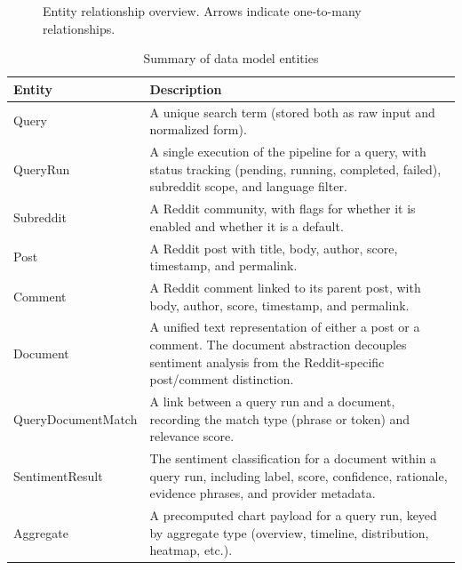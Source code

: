 \begin{figure}[H]
    \centering
    \caption{Entity relationship overview. Arrows indicate one-to-many relationships.}
    \label{fig:er_diagram}
\end{figure}

\begin{table}[H]
\centering
\caption{Summary of data model entities}
\label{tab:entities}
\small
\begin{tabularx}{\textwidth}{l>{\raggedright\arraybackslash}X}
\toprule
\textbf{Entity} & \textbf{Description} \\
\midrule
Query & A unique search term (stored both as raw input and normalized form). \\
QueryRun & A single execution of the pipeline for a query, with status tracking (pending, running, completed, failed), subreddit scope, and language filter. \\
Subreddit & A Reddit community, with flags for whether it is enabled and whether it is a default. \\
Post & A Reddit post with title, body, author, score, timestamp, and permalink. \\
Comment & A Reddit comment linked to its parent post, with body, author, score, timestamp, and permalink. \\
Document & A unified text representation of either a post or a comment. The document abstraction decouples sentiment analysis from the Reddit-specific post/comment distinction. \\
QueryDocumentMatch & A link between a query run and a document, recording the match type (phrase or token) and relevance score. \\
SentimentResult & The sentiment classification for a document within a query run, including label, score, confidence, rationale, evidence phrases, and provider metadata. \\
Aggregate & A precomputed chart payload for a query run, keyed by aggregate type (overview, timeline, distribution, heatmap, etc.). \\
\bottomrule
\end{tabularx}
\end{table}

